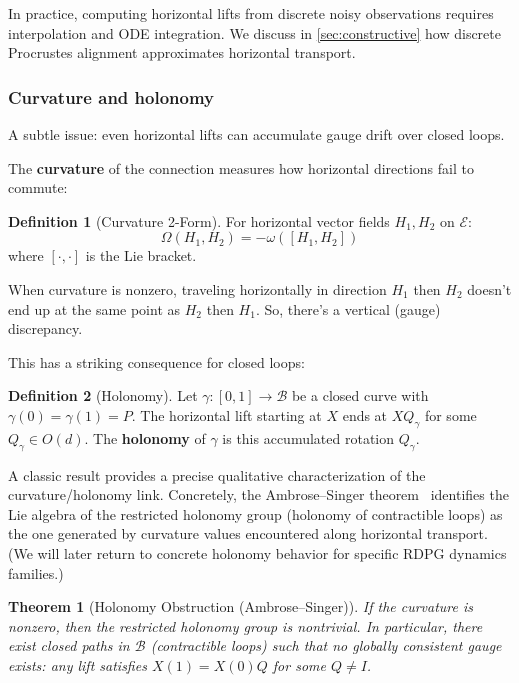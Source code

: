 \documentclass{article}
\theoremstyle{plain}
\newtheorem{theorem}{Theorem}
\theoremstyle{definition}
\newtheorem{definition}{Definition}
\theoremstyle{remark}
\begin{document}
In practice, computing horizontal lifts from discrete noisy observations requires interpolation and ODE integration.
We discuss in \cref{sec:constructive} how discrete Procrustes alignment approximates horizontal transport.


\subsubsection{Curvature and holonomy}

A subtle issue: even horizontal lifts can accumulate gauge drift over closed loops.

The \textbf{curvature} of the connection measures how horizontal directions fail to commute:

\begin{definition}[Curvature 2-Form]
For horizontal vector fields $H_1, H_2$ on $\mathcal{E}$:
\begin{equation}
\Omega(H_1, H_2) = -\omega([H_1, H_2])
\end{equation}
where $[\cdot, \cdot]$ is the Lie bracket.
\end{definition}

When curvature is nonzero, traveling horizontally in direction $H_1$ then $H_2$ doesn't end up at the same point as $H_2$ then $H_1$. So, there's a vertical (gauge) discrepancy.

This has a striking consequence for closed loops:

\begin{definition}[Holonomy]
Let $\gamma: [0,1] \to \mathcal{B}$ be a closed curve with $\gamma(0) = \gamma(1) = P$.
The horizontal lift starting at $X$ ends at $X Q_\gamma$ for some $Q_\gamma \in O(d)$.
The \textbf{holonomy} of $\gamma$ is this accumulated rotation $Q_\gamma$.
\end{definition}

A classic result provides a precise qualitative characterization of the curvature/holonomy link. Concretely, the Ambrose--Singer theorem~\citep{kobayashi1963foundations} identifies the Lie algebra of the restricted holonomy group (holonomy of contractible loops) as the one generated by curvature values encountered along horizontal transport. (We will later return to concrete holonomy behavior for specific RDPG dynamics families.)

\begin{theorem}[Holonomy Obstruction (Ambrose--Singer)]
If the curvature is nonzero, then the restricted holonomy group is nontrivial. In particular, there exist closed paths in $\mathcal{B}$ (contractible loops) such that no globally consistent gauge exists: any lift satisfies $X(1) = X(0) Q$ for some $Q \neq I$.
\end{theorem}
\end{document}

